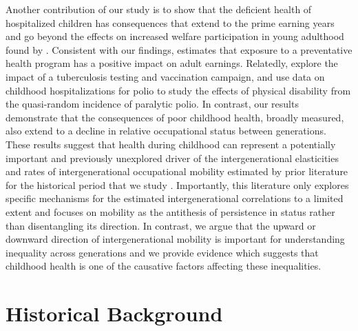 \documentclass[12pt,english]{article}
\begin{document}
Another contribution of our study is to show that the deficient health of hospitalized children has consequences that extend to the prime earning years and go beyond the effects on increased welfare participation in young adulthood found by \cite{Currie2010}. Consistent with our findings, \cite{Velasco2019} estimates that exposure to a preventative health program has a positive impact on adult earnings. Relatedly, \cite{ButikoferSalvanes2019} explore the impact of a tuberculosis testing and vaccination campaign, and \cite{Gensowski2018} use data on childhood hospitalizations for polio to study the effects of physical disability from the quasi-random incidence of paralytic polio. In contrast, our results demonstrate that the consequences of poor childhood health, broadly measured, also extend to a decline in relative occupational status between generations. These results suggest that health during childhood can represent a potentially important and previously unexplored driver of the intergenerational elasticities and rates of intergenerational occupational mobility estimated by prior literature for the historical period that we study  \citep{LongFerrie2013,Long2013,Clark2014,ClarkCummins2015,OlivettiPaserman2015,Feigenbaum2018,Perez2019,Song-etal2020,Ward2021}. Importantly, this literature only explores specific mechanisms for the estimated intergenerational correlations to a limited extent and focuses on mobility as the antithesis of persistence in status rather than disentangling its direction. In contrast, we argue that the upward or downward direction of intergenerational mobility is important for understanding inequality across generations and we provide evidence which suggests that childhood health is one of the causative factors affecting these inequalities.

\section[Historical Background]{Historical Background\label{sec:Background}}
\end{document}
